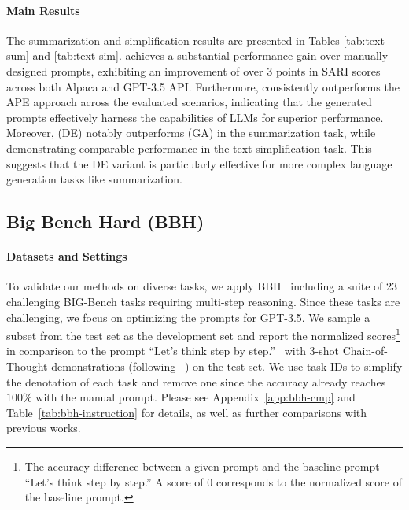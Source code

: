 \paragraph{Main Results}
The summarization and simplification results are presented in Tables \ref{tab:text-sum} and \ref{tab:text-sim}. \modelname achieves a substantial performance gain over manually designed prompts, exhibiting an improvement of over 3 points in SARI scores across both Alpaca and GPT-3.5 API. Furthermore, \modelname consistently outperforms the APE approach across the evaluated scenarios, indicating that the generated prompts effectively harness the capabilities of LLMs for superior performance. 
Moreover, \modelname (DE) notably outperforms \modelname (GA) in the summarization task, while demonstrating comparable performance in the text simplification task. This suggests that the DE variant is particularly effective for more complex language generation tasks like summarization.

\subsection{Big Bench Hard (BBH)}
\paragraph{Datasets and Settings}
To validate our methods on diverse tasks, we apply BBH~\citep{suzgun2022challenging} including a suite of 23 challenging BIG-Bench tasks requiring multi-step reasoning. Since these tasks are challenging, we focus on optimizing the prompts for GPT-3.5.
We sample a subset from the test set as the development set and report the normalized scores\footnote{The accuracy difference between a given prompt and the baseline prompt ``Let's think step by step.'' A score of 0 corresponds to the normalized score of the baseline prompt.} in comparison to the prompt ``Let's think step by step.''~\citep{kojima2022large} with 3-shot Chain-of-Thought demonstrations (following ~\cite{fu2023chain}) on the test set. We use task IDs to simplify the denotation of each task and remove one since the accuracy already reaches $100$\% with the manual prompt. Please see Appendix~\ref{app:bbh-cmp} and Table~\ref{tab:bbh-instruction} for details, as well as further comparisons with previous works.
